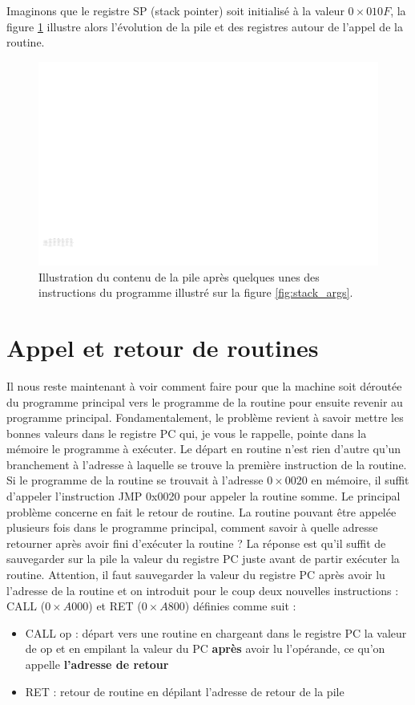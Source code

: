 Imaginons que le registre SP (stack pointer) soit initialisé à la valeur $0\times010F$, la figure \ref{fig:stack_args_fig} illustre alors l'évolution de la pile et des registres autour de l'appel de la routine. 

\begin{figure}[htbp]
\includegraphics[width=\columnwidth]{Figs/stack_args_fig.pdf}
\caption{\label{fig:stack_args_fig} Illustration du contenu de la pile après quelques unes des instructions du programme illustré sur la figure \ref{fig:stack_args}.}
\end{figure}



\section{Appel et retour de routines}

Il nous reste maintenant à voir comment faire pour que la machine soit déroutée du programme principal vers le programme de la routine pour ensuite revenir au programme principal. Fondamentalement, le problème revient à savoir mettre les bonnes valeurs dans le registre PC qui, je vous le rappelle, pointe dans la mémoire le programme à exécuter. Le départ en routine n'est rien d'autre qu'un branchement à l'adresse à laquelle se trouve la première instruction de la routine. Si le programme de la routine se trouvait à l'adresse $0\times0020$ en mémoire, il suffit d'appeler l'instruction JMP 0x0020 pour appeler la routine somme. Le principal problème concerne en fait le retour de routine. La routine pouvant être appelée plusieurs fois dans le programme principal, comment savoir à quelle adresse retourner après avoir fini d'exécuter la routine ? La réponse est qu'il suffit de sauvegarder sur la pile la valeur du registre PC juste avant de partir exécuter la routine. Attention, il faut sauvegarder la valeur du registre PC après avoir lu l'adresse de la routine et on introduit pour le coup deux nouvelles instructions : CALL ($0\times A000$) et RET  ($0\times A800$) définies comme suit :
\begin{itemize}
\item CALL op : départ vers une routine en chargeant dans le registre PC la valeur de op et en empilant la valeur du PC \textbf{après} avoir lu l'opérande, ce qu'on appelle \textbf{l'adresse de retour}
\item RET : retour de routine en dépilant l'adresse de retour de la pile
\end{itemize}

